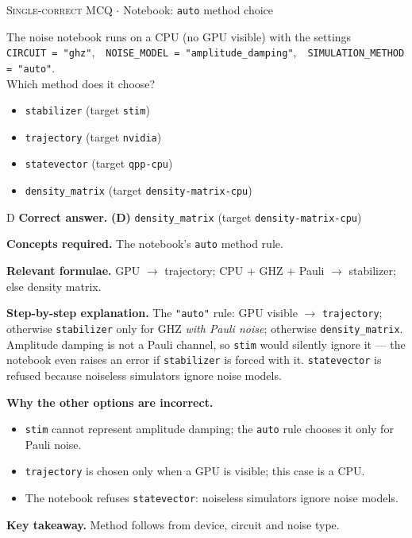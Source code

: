 \documentclass[11pt,a4paper]{article}
\newcommand{\optlabel}[1]{\textbf{(#1)}}
\newcommand{\correctlabel}[1]{\textcolor{okgreen}{\textbf{(#1)}\,\ding{51}}}
\newenvironment{qitem}[1]{\begin{list}{}{\setlength{\leftmargin}{3.3em}\setlength{\labelwidth}{3.1em}%
  \setlength{\labelsep}{0.2em}\setlength{\topsep}{3pt}\setlength{\parsep}{3pt}}\item[\textbf{Q.#1}\hfill]}{\end{list}}
\newcommand{\qsep}{\par\vspace{2pt}{\color{black!15}\hrule}\vspace{4pt}}
\newcommand{\qmeta}[2]{{\footnotesize\color{black!60}\textsc{#1} \;$\cdot$\; #2}\par}
\begin{document}
\begin{qitem}{74}
\qmeta{Single-correct MCQ}{Notebook: \texttt{auto} method choice}
The noise notebook runs on a CPU (no GPU visible) with the settings\\
\hspace*{1em}\texttt{CIRCUIT = "ghz"},\ \ \texttt{NOISE\_MODEL = "amplitude\_damping"},\ \ \texttt{SIMULATION\_METHOD = "auto"}.\\
Which method does it choose?
\begin{itemize}[leftmargin=2.6em, labelsep=0.4em, itemsep=2pt, topsep=3pt]
\item[\optlabel{A}] \texttt{stabilizer} (target \texttt{stim})
\item[\optlabel{B}] \texttt{trajectory} (target \texttt{nvidia})
\item[\optlabel{C}] \texttt{statevector} (target \texttt{qpp-cpu})
\item[\correctlabel{D}] \texttt{density\_matrix} (target \texttt{density-matrix-cpu})
\end{itemize}
\end{qitem}
\begin{solbox}{D}
\textbf{\color{brand}Correct answer.} \textcolor{okgreen}{\textbf{(D)}} \texttt{density\_matrix} (target \texttt{density-matrix-cpu})

\textbf{\color{brand}Concepts required.} The notebook's \texttt{auto} method rule.

\textbf{\color{brand}Relevant formulae.} GPU $\to$ trajectory; CPU + GHZ + Pauli $\to$ stabilizer; else density matrix.

\textbf{\color{brand}Step-by-step explanation.} The \texttt{"auto"} rule: GPU visible $\to$ \texttt{trajectory}; otherwise \texttt{stabilizer} only for GHZ \emph{with Pauli noise}; otherwise \texttt{density\_matrix}.
Amplitude damping is not a Pauli channel, so \texttt{stim} would silently ignore it --- the notebook even raises an error if \texttt{stabilizer} is forced with it.
\texttt{statevector} is refused because noiseless simulators ignore noise models.

\textbf{\color{brand}Why the other options are incorrect.}
\begin{itemize}[leftmargin=2.4em, itemsep=1pt, topsep=2pt]
\item[\textbf{(A)}] \texttt{stim} cannot represent amplitude damping; the \texttt{auto} rule chooses it only for Pauli noise.
\item[\textbf{(B)}] \texttt{trajectory} is chosen only when a GPU is visible; this case is a CPU.
\item[\textbf{(C)}] The notebook refuses \texttt{statevector}: noiseless simulators ignore noise models.
\end{itemize}
\textbf{\color{brand}Key takeaway.} Method follows from device, circuit and noise type.
\end{solbox}
\qsep
\end{document}
